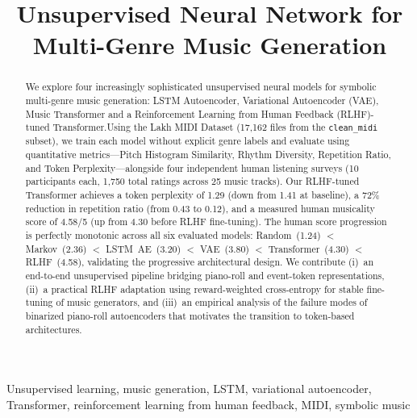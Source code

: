 \documentclass[conference]{IEEEtran}
\begin{document}
\title{Unsupervised Neural Network for\\Multi-Genre Music Generation}

\author{
}

\maketitle

\begin{abstract}
We explore four increasingly sophisticated unsupervised neural models for symbolic multi-genre music generation: LSTM Autoencoder, Variational Autoencoder (VAE), Music Transformer and a Reinforcement Learning from Human Feedback (RLHF)-tuned Transformer.Using the Lakh MIDI Dataset (17,162 files from the \texttt{clean\_midi} subset), we train each model without explicit genre labels and evaluate using quantitative metrics---Pitch Histogram Similarity, Rhythm Diversity, Repetition Ratio, and Token Perplexity---alongside four independent human listening surveys (10 participants each, 1,750 total ratings across 25 music tracks). Our RLHF-tuned Transformer achieves a token perplexity of 1.29 (down from 1.41 at baseline), a 72\% reduction in repetition ratio (from 0.43 to 0.12), and a measured human musicality score of 4.58/5 (up from 4.30 before RLHF fine-tuning). The human score progression is perfectly monotonic across all six evaluated models: Random~(1.24) $<$ Markov~(2.36) $<$ LSTM~AE~(3.20) $<$ VAE~(3.80) $<$ Transformer~(4.30) $<$ RLHF~(4.58), validating the progressive architectural design. We contribute (i)~an end-to-end unsupervised pipeline bridging piano-roll and event-token representations, (ii)~a practical RLHF adaptation using reward-weighted cross-entropy for stable fine-tuning of music generators, and (iii)~an empirical analysis of the failure modes of binarized piano-roll autoencoders that motivates the transition to token-based architectures.
\end{abstract}


\begin{IEEEkeywords}
Unsupervised learning, music generation, LSTM, variational autoencoder, Transformer, reinforcement learning from human feedback, MIDI, symbolic music
\end{IEEEkeywords}
\end{document}
